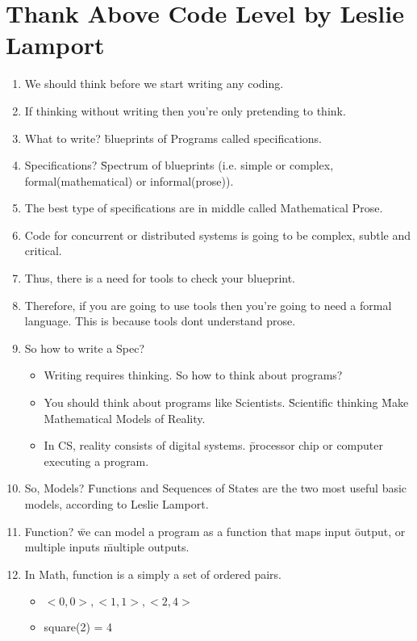 \documentclass{article}
\begin{document}
    \section{Thank Above Code Level by Leslie Lamport}
 \begin{enumerate}
        \item We should think before we start writing any coding.
        \item If thinking without writing then you're only pretending to think.
        \item What to write? \= blueprints of Programs called specifications.
        \item Specifications? \= Spectrum of blueprints (i.e. simple or complex, formal(mathematical) or informal(prose)).
        \item The best type of specifications are in middle\- called Mathematical Prose.
        \item Code for concurrent or distributed systems is going to be complex, subtle and critical.
        \item Thus, there is a need for tools to check your blueprint.
        \item Therefore, if you are going to use tools then you're going to need a formal language. This is because tools dont understand prose.
        \item So how to write a Spec? \begin{itemize}
            \item Writing requires thinking. So how to think about programs?
            \item You should think about programs like Scientists. \= Scientific thinking \= Make Mathematical Models of Reality.
            \item In CS, reality consists of digital systems. \= processor chip or computer executing a program. \end{itemize}
        \item So, Models? \= Functions and Sequences of States are the two most useful basic models, according to Leslie Lamport.
        \item Function? \= we can model a program as a function that maps input \= output, or multiple inputs \= multiple outputs.
        \item In Math, function is a simply a set of ordered pairs.
            \begin{itemize}
            \item ${<0,0>, <1,1>, <2,4>} $
            \item square(2) = 4

\end{itemize}
\end{enumerate}
\end{document}
